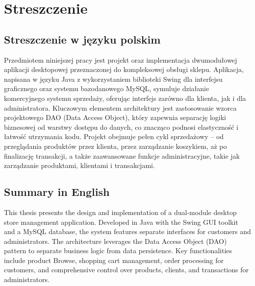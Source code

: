 \chapter{Streszczenie}
\label{chap:nowe_wprowadzenie}

\section{Streszczenie w języku polskim}
Przedmiotem niniejszej pracy jest projekt oraz implementacja dwumodułowej aplikacji desktopowej przeznaczonej do kompleksowej obsługi sklepu. Aplikacja, napisana w języku Java z wykorzystaniem biblioteki Swing dla interfejsu graficznego oraz systemu bazodanowego MySQL, symuluje działanie komercyjnego systemu sprzedaży, oferując interfejs zarówno dla klienta, jak i dla administratora. Kluczowym elementem architektury jest zastosowanie wzorca projektowego DAO (Data Access Object), który zapewnia separację logiki biznesowej od warstwy dostępu do danych, co znacząco podnosi elastyczność i łatwość utrzymania kodu. Projekt obejmuje pełen cykl sprzedażowy – od przeglądania produktów przez klienta, przez zarządzanie koszykiem, aż po finalizację transakcji, a także zaawansowane funkcje administracyjne, takie jak zarządzanie produktami, klientami i transakcjami.

\section{Summary in English}
This thesis presents the design and implementation of a dual-module desktop store management application. Developed in Java with the Swing GUI toolkit and a MySQL database, the system features separate interfaces for customers and administrators. The architecture leverages the Data Access Object (DAO) pattern to separate business logic from data persistence. Key functionalities include product Browse, shopping cart management, order processing for customers, and comprehensive control over products, clients, and transactions for administrators.